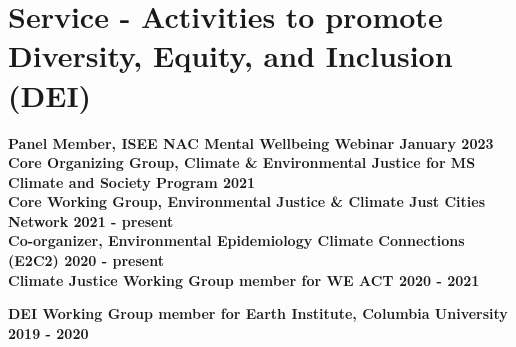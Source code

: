 \section*{Service - Activities to promote Diversity, Equity, and Inclusion (DEI)}

\noindent \textbf{Panel Member, ISEE NAC Mental Wellbeing Webinar \hfill January 2023}\\

\noindent \textbf{Core Organizing Group, Climate \& Environmental Justice for MS Climate and Society Program \hfill 2021}\\

\noindent \textbf{Core Working Group, Environmental Justice \& Climate Just Cities Network \hfill 2021 - present}\\

\noindent \textbf{Co-organizer, Environmental Epidemiology Climate Connections (E2C2) \hfill 2020 - present}\\

\noindent \textbf{Climate Justice Working Group member for WE ACT \hfill 2020 - 2021}
\medskip

\noindent \textbf{DEI Working Group member for Earth Institute, Columbia University \hfill 2019 - 2020}\\



